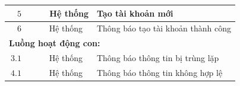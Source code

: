 \documentclass[12pt]{article}
\begin{document}
\begin{table}[ht]
\begin{tabularx}{\textwidth}{lXX}
      \hline
      $\quad 5\qquad\quad$ Hệ thống & \multicolumn{2}{l}{Tạo tài khoản mới} \\
      \hline
      $\quad 6\qquad\quad$ Hệ thống & \multicolumn{2}{l}{Thông báo tạo tài khoản thành công} \\
      \hline
      \multicolumn{3}{l}{\textbf{Luồng hoạt động con:}} \\
      \hline
      $\ 3.1\qquad\quad$ Hệ thống & \multicolumn{2}{l}{Thông báo thông tin bị trùng lặp} \\
      \hline
      $\ 4.1\qquad\quad$ Hệ thống & \multicolumn{2}{l}{Thông báo thông tin không hợp lệ} \\
      \bottomrule
    \end{tabularx}
  \end{table}
  \FloatBarrier
\end{document}
